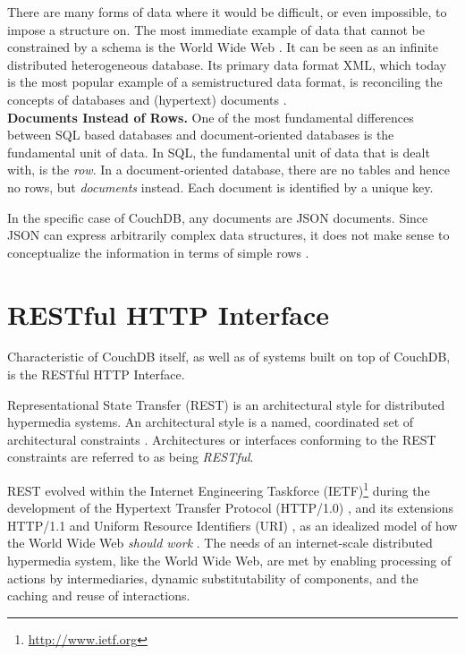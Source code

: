 There are many forms of data where it would be difficult, or even impossible, to impose a structure on. The most immediate example of data that cannot be constrained by a schema is the World Wide Web \cite{Bun97}. It can be seen as an infinite distributed heterogeneous database. Its primary data format XML, which today is the most popular example of a semistructured data format, is reconciling the concepts of databases and (hypertext) documents \cite{Abi01}.\\

\noindent
{\bf Documents Instead of Rows.}
One of the most fundamental differences between SQL based databases and document-oriented databases is the fundamental unit of data. In SQL, the fundamental unit of data that is dealt with, is the \emph{row}. In a document-oriented database, there are no tables and hence no rows, but \emph{documents} instead. Each document is identified by a unique key.

In the specific case of CouchDB, any documents are JSON documents. Since JSON can express arbitrarily complex data structures, it does not make sense to conceptualize the information in terms of simple rows \cite[p.~14]{Cha09}.


\section{RESTful HTTP Interface}
\label{RESTful HTTP Interface}

Characteristic of CouchDB itself, as well as of systems built on top of CouchDB, is the RESTful HTTP Interface.

Representational State Transfer (REST) is an architectural style for distributed hypermedia systems. An architectural style is a named, coordinated set of architectural constraints \cite[p.~xvi]{Fie00}. Architectures or interfaces conforming to the REST constraints are referred to as being \emph{RESTful}.

REST evolved within the Internet Engineering Taskforce (IETF)\footnote{\url{http://www.ietf.org}} during the development of the Hypertext Transfer Protocol (HTTP/1.0) \cite{rfc1945}, and its extensions HTTP/1.1 \cite{rfc2616} and Uniform Resource Identifiers (URI) \cite{rfc2396}, as an idealized model of how the World Wide Web \emph{should work} \cite[p.~148]{Fie00}. The needs of an internet-scale distributed hypermedia system, like the World Wide Web, are met by enabling processing of actions by intermediaries, dynamic substitutability of components, and the caching and reuse of interactions.

